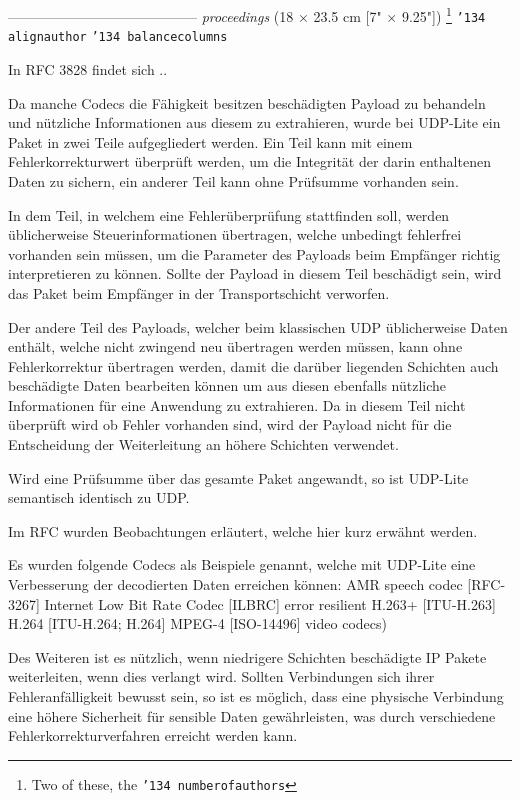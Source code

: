 \documentclass{template}
\begin{document}
-----------------------------------------
\textit{proceedings}
(18 $\times$ 23.5 cm [7" $\times$ 9.25"])
\footnote{Two of these, the {\texttt{\char'134 numberofauthors}}}
{\texttt{\char'134 alignauthor}}
{\texttt{\char'134 balancecolumns}}


In RFC 3828 findet sich ..

Da manche Codecs die Fähigkeit besitzen 
beschädigten Payload zu behandeln und nützliche Informationen
aus diesem zu extrahieren, wurde bei UDP-Lite ein Paket in
zwei Teile aufgegliedert werden. Ein Teil kann mit einem Fehlerkorrekturwert
überprüft werden, um die Integrität der darin enthaltenen Daten zu sichern,
ein anderer Teil kann ohne Prüfsumme vorhanden sein.

In dem Teil, in welchem
eine Fehlerüberprüfung stattfinden soll, werden üblicherweise Steuerinformationen
übertragen, welche unbedingt fehlerfrei vorhanden sein müssen, 
um die Parameter des Payloads beim Empfänger richtig interpretieren zu können.
Sollte der Payload in diesem Teil beschädigt sein, wird das Paket beim Empfänger in der
Transportschicht verworfen.

Der andere Teil des Payloads, welcher beim klassischen UDP üblicherweise Daten enthält,
welche nicht zwingend neu übertragen werden müssen, kann ohne Fehlerkorrektur übertragen werden,
damit die darüber liegenden Schichten auch beschädigte Daten bearbeiten können
um aus diesen ebenfalls nützliche Informationen für eine Anwendung zu extrahieren.
Da in diesem Teil nicht überprüft wird ob Fehler vorhanden sind,
wird der Payload nicht für die Entscheidung der Weiterleitung an höhere Schichten verwendet.

Wird eine Prüfsumme über das gesamte Paket angewandt, so ist UDP-Lite semantisch identisch
zu UDP.

Im RFC wurden Beobachtungen erläutert, welche hier kurz erwähnt werden.

Es wurden folgende Codecs als Beispiele genannt, welche mit UDP-Lite
eine Verbesserung der decodierten Daten erreichen können:
AMR speech codec [RFC-3267]
Internet Low Bit Rate Codec [ILBRC]
error resilient H.263+ [ITU-H.263]
H.264 [ITU-H.264; H.264]
MPEG-4 [ISO-14496] video codecs)

Des Weiteren ist es nützlich, wenn niedrigere Schichten beschädigte IP Pakete
weiterleiten, wenn dies verlangt wird. Sollten Verbindungen sich ihrer
Fehleranfälligkeit bewusst sein, so ist es möglich, dass eine physische Verbindung
eine höhere Sicherheit für sensible Daten gewährleisten, was durch verschiedene
Fehlerkorrekturverfahren erreicht werden kann.
\end{document}
